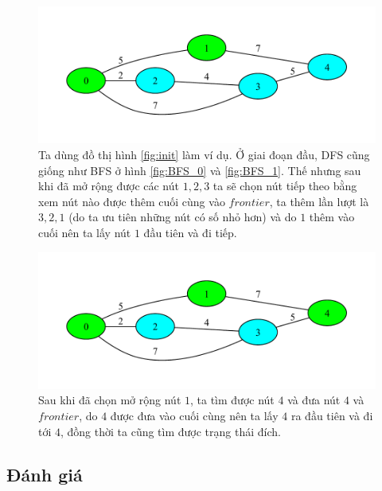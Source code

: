 \begin{figure}[H]
    \centering
    \includegraphics[scale=0.8]{figure/DFS/2.pdf}
    \caption{Ta dùng đồ thị hình \ref{fig:init} làm ví dụ. Ở giai đoạn đầu, DFS cũng giống như BFS ở hình \ref{fig:BFS_0} và \ref{fig:BFS_1}. Thế nhưng sau khi đã mở rộng được các nút $1, 2, 3$ ta sẽ chọn nút tiếp theo bằng xem nút nào được thêm cuối cùng vào $frontier$, ta thêm lần lượt là $3, 2, 1$ (do ta ưu tiên những nút có số nhỏ hơn) và do $1$ thêm vào cuối nên ta lấy nút $1$ đầu tiên và đi tiếp.}
    \label{fig:DFS_2}
\end{figure}

\begin{figure}[H]
    \centering
    \includegraphics[scale=0.8]{figure/DFS/3.pdf}
    \caption{Sau khi đã chọn mở rộng nút $1$, ta tìm được nút $4$ và đưa nút $4$ và $frontier$, do $4$ được đưa vào cuối cùng nên ta lấy $4$ ra đầu tiên và đi tới $4$, đồng thời ta cũng tìm được trạng thái đích.}
    \label{fig:DFS_3}
\end{figure}

\subsection{Đánh giá}

